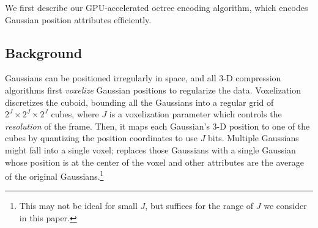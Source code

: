 
      

We first describe our GPU-accelerated octree encoding algorithm, which encodes Gaussian position attributes efficiently.

\subsection{Background}\label{sec:background}

%
Gaussians can be positioned irregularly in space, and all 3-D compression algorithms first \textit{voxelize} Gaussian positions to regularize the data.
%
Voxelization discretizes the cuboid, bounding all the Gaussians into a regular grid of $2^J \times 2^J \times 2^J$ cubes, where $J$ is a voxelization parameter which controls the \textit{resolution} of the \gs{} frame.
%
Then, it maps each Gaussian's 3-D position to one of the cubes by quantizing the position coordinates to use $J$ bits.
%
Multiple Gaussians might fall into a single voxel; \gsnfs{} replaces those Gaussians with a single Gaussian whose position is at the center of the voxel and other attributes are the average of the original Gaussians.\footnote{This may not be ideal for small $J$, but suffices for the range of $J$ we consider in this paper.}



